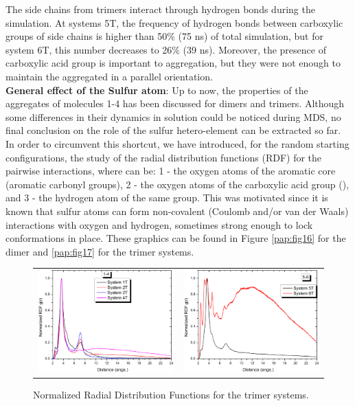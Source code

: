 The side chains from trimers interact through hydrogen bonds during the simulation. At systems 5T, the frequency of hydrogen bonds between carboxylic groups of side chains is higher than 50\% (75 ns) of total simulation, but for system 6T, this number decreases to 26\% (39 ns). Moreover, the presence of carboxylic acid group is important to aggregation, but they were not enough to maintain the aggregated in a parallel orientation.\\


\textbf{General effect of the Sulfur atom}: Up to now, the properties of the aggregates of molecules 1-4 has been discussed for dimers and trimers. Although some differences in their dynamics in solution could be noticed during MDS, no final conclusion on the role of the sulfur hetero-element can be extracted so far. In order to circumvent this shortcut, we have introduced, for the random starting configurations, the study of the radial distribution functions (RDF) for the  pairwise interactions, where  can be: 1 - the oxygen atoms of the aromatic core (aromatic carbonyl groups), 2 - the oxygen atoms of the carboxylic acid group (), and 3 - the hydrogen atom of the same group. This was motivated since it is known that sulfur atoms can form non-covalent (Coulomb and/or van der Waals) interactions with oxygen and hydrogen,\cite{jackson2013controlling} sometimes strong enough to lock conformations in place. These graphics can be found in Figure \ref{pap:fig16} for the dimer and \ref{pap:fig17} for the trimer systems.\\

\begin{figure}[htb]
	\begin{tabular}{cc}
		\includegraphics[width=0.45\columnwidth]{image/rdf_14} &
		\includegraphics[width=0.45\columnwidth]{image/rdf_56} \\     
	\end{tabular}
	\caption{Normalized Radial Distribution Functions for the trimer systems.}
	\label{pap:fig15}
\end{figure}	

